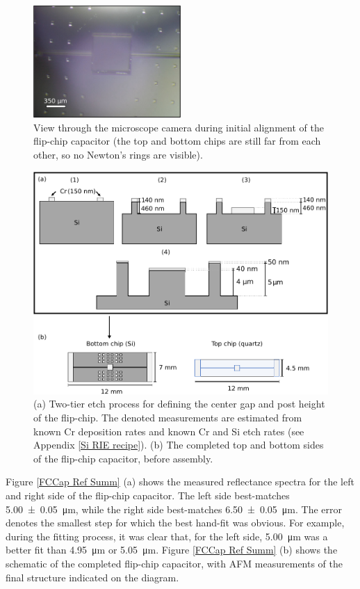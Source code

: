 \documentclass[double,12pt,1in,seploa]{beavtex}
\begin{document}
\begin{figure}
    \includegraphics[width = 0.5\textwidth]{FCCap during alignment.pdf}
    \caption{View through the microscope camera during initial alignment of the flip-chip capacitor (the top and bottom chips are still far from each other, so no Newton's rings are visible).}
    \label{FCcap during alignment}
\end{figure}

\begin{figure}
    \includegraphics[width=1\textwidth]{Two-tier etch.pdf}
    \caption{(a) Two-tier etch process for defining the center gap and post height of the flip-chip. The denoted measurements are estimated from known Cr deposition rates and known Cr and Si etch rates (see Appendix \ref{Si RIE recipe}). (b) The completed top and bottom sides of the flip-chip capacitor, before assembly.}
    \label{twotier}
\end{figure}

Figure \ref{FCCap Ref Summ} (a) shows the measured reflectance spectra for the left and right side of the flip-chip capacitor. The left side best-matches \SI{5.00(5)}{\micro\meter}, while the right side best-matches \SI{6.50(5)}{\micro\meter}. The error denotes the smallest step for which the best hand-fit was obvious. For example, during the fitting process, it was clear that, for the left side, \SI{5.00}{\micro\meter} was a better fit than \SI{4.95}{\micro\meter} or \SI{5.05}{\micro\meter}. Figure \ref{FCCap Ref Summ} (b) shows the schematic of the completed flip-chip capacitor, with AFM measurements of the final structure indicated on the diagram.
\end{document}
